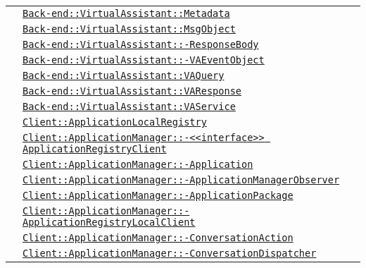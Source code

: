 \begin{longtable}{|>{\centering}m{3cm}|m{10cm}<{\centering}|}
& \hyperref[Back-end::VirtualAssistant::Metadata]{\texttt{Back-end::VirtualAssistant::Metadata}}\\
& \hyperref[Back-end::VirtualAssistant::MsgObject]{\texttt{Back-end::VirtualAssistant::MsgObject}}\\
& \hyperref[Back-end::VirtualAssistant::ResponseBody]{\texttt{Back-end::VirtualAssistant::-\linebreak ResponseBody}}\\
& \hyperref[Back-end::VirtualAssistant::VAEventObject]{\texttt{Back-end::VirtualAssistant::-\linebreak VAEventObject}}\\
& \hyperref[Back-end::VirtualAssistant::VAQuery]{\texttt{Back-end::VirtualAssistant::VAQuery}}\\
& \hyperref[Back-end::VirtualAssistant::VAResponse]{\texttt{Back-end::VirtualAssistant::VAResponse}}\\
& \hyperref[Back-end::VirtualAssistant::VAService]{\texttt{Back-end::VirtualAssistant::VAService}}\\
& \hyperref[Client::ApplicationLocalRegistry]{\texttt{Client::ApplicationLocalRegistry}}\\
& \hyperref[Client::ApplicationManager::<<interface>> ApplicationRegistryClient]{\texttt{Client::ApplicationManager::-\linebreak <<interface>> ApplicationRegistryClient}}\\
& \hyperref[Client::ApplicationManager::Application]{\texttt{Client::ApplicationManager::-\linebreak Application}}\\
& \hyperref[Client::ApplicationManager::ApplicationManagerObserver]{\texttt{Client::ApplicationManager::-\linebreak ApplicationManagerObserver}}\\
& \hyperref[Client::ApplicationManager::ApplicationPackage]{\texttt{Client::ApplicationManager::-\linebreak ApplicationPackage}}\\
& \hyperref[Client::ApplicationManager::ApplicationRegistryLocalClient]{\texttt{Client::ApplicationManager::-\linebreak ApplicationRegistryLocalClient}}\\
& \hyperref[Client::ApplicationManager::ConversationAction]{\texttt{Client::ApplicationManager::-\linebreak ConversationAction}}\\
& \hyperref[Client::ApplicationManager::ConversationDispatcher]{\texttt{Client::ApplicationManager::-\linebreak ConversationDispatcher}}\\

\end{longtable}
